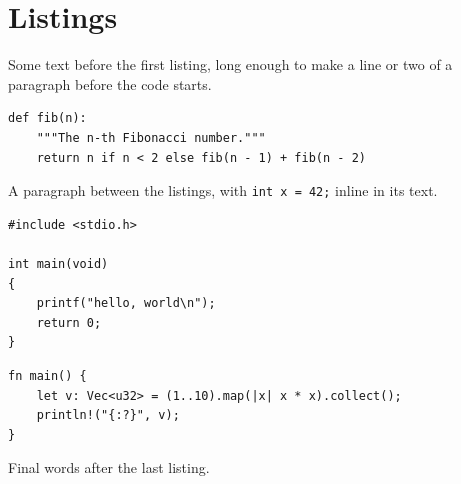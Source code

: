 \documentclass{article}
\begin{document}
\section{Listings}
Some text before the first listing, long enough to make a line or two
of a paragraph before the code starts.
\begin{verbatim}
def fib(n):
    """The n-th Fibonacci number."""
    return n if n < 2 else fib(n - 1) + fib(n - 2)
\end{verbatim}
A paragraph between the listings, with \texttt{int x = 42;}
inline in its text.
\begin{verbatim}
#include <stdio.h>

int main(void)
{
    printf("hello, world\n");
    return 0;
}
\end{verbatim}
\begin{verbatim}
fn main() {
    let v: Vec<u32> = (1..10).map(|x| x * x).collect();
    println!("{:?}", v);
}
\end{verbatim}
Final words after the last listing.
\end{document}
